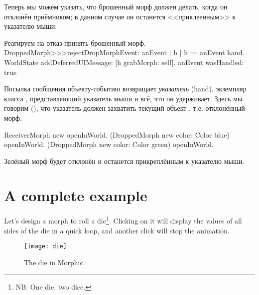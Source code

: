 \documentclass[a4paper,10pt,twoside]{book}
\begin{document}
Теперь мы можем указать, что брошенный морф должен делать, когда он отклонён приёмником; в данном случае он останется <<приклеенным>> к указателю мыши:
\begin{method}{Реагируем на отказ принять брошенный морф.}
DroppedMorph>>>rejectDropMorphEvent: anEvent
	| h |
	h := anEvent hand.
	WorldState
		addDeferredUIMessage: [h grabMorph: self].
	anEvent wasHandled: true
\end{method}

Посылка сообщения  объекту-событию возвращает \emph{указатель} (hand), экземпляр класса , представляющий указатель мыши и всё, что он удерживает.
Здесь мы говорим  (), что указатель должен захватить текущий объект , т.е. отклонённый морф.

\begin{code}{}
ReceiverMorph new openInWorld.
(DroppedMorph new color: Color blue) openInWorld.
(DroppedMorph new color: Color green) openInWorld.
\end{code}
\noindent
Зелёный морф будет отклонён и останется прикреплённым к указателю мыши.

\section{A complete example}

Let's design a morph to roll a die\footnote{NB: One die, two dice.}. Clicking on it will display the values of all sides of the die in a quick loop, and another click will stop the animation.

\begin{figure}[ht]
	\centerline{\texttt{[image: die]}}
	\caption{The die in Morphic.
		}
\end{figure}
\end{document}
